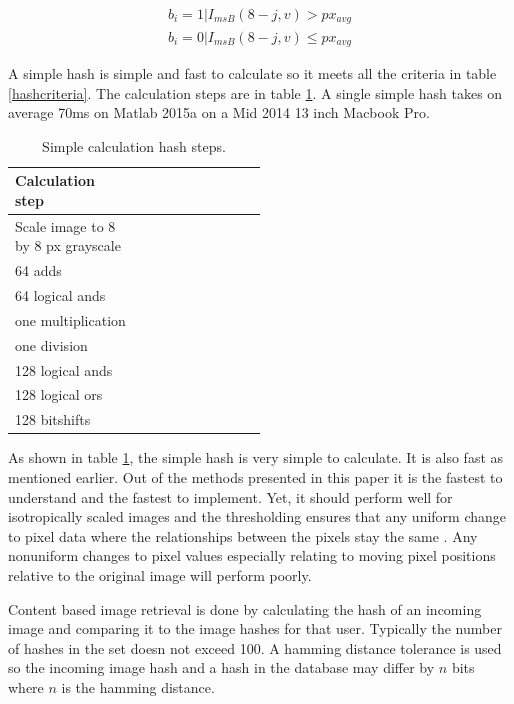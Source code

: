 \documentclass[english,12pt,a4paper,pdftex,elec,utf8]{aaltothesis}
\begin{document}
\begin{equation} \label{simplehasheqmirror}
  \begin{split}
  b_{i} = 1 | I_{msB}(8-j,v) > px_{avg}\\
  b_{i} = 0 | I_{msB}(8-j,v) \leq px_{avg}
  \end{split}
\end{equation}

A simple hash is simple and fast to calculate so it meets all the criteria in table \ref{hashcriteria}. The calculation steps are in table \ref{simplesteps}. A single simple hash takes on average 70ms on Matlab 2015a on a Mid 2014 13 inch Macbook Pro.

\def\arraystretch{1.5}
\begin{table}[htb]
\caption{Simple calculation hash steps.}
\label{simplesteps}
\begin{center}
\begin{tabular}{lp{0.5\linewidth}}
  Calculation step\\
  \hline \hline
  Scale image to 8 by 8 px grayscale\\
  \hline
  64 adds\\
  \hline
  64 logical ands\\
  \hline
  one multiplication\\
  \hline
  one division\\
  \hline
  128 logical ands\\
  \hline
  128 logical ors\\
  \hline
  128 bitshifts\\
  \hline
\end{tabular}
\end{center}\end{table}

As shown in table \ref{simplesteps}, the simple hash is very simple to calculate. It is also fast as mentioned earlier. Out of the methods presented in this paper it is the fastest to understand and the fastest to implement. Yet, it should perform well for isotropically scaled images and the thresholding ensures that any uniform change to pixel data where the relationships between the pixels stay the same \cite{Zauner2010}. Any nonuniform changes to pixel values especially relating to moving pixel positions relative to the original image will perform poorly.

Content based image retrieval is done by calculating the hash of an incoming image and comparing it to the image hashes for that user. Typically the number of hashes in the set doesn not exceed 100. A hamming distance tolerance is used so the incoming image hash and a hash in the database may differ by $n$ bits where $n$ is the hamming distance.
\end{document}
